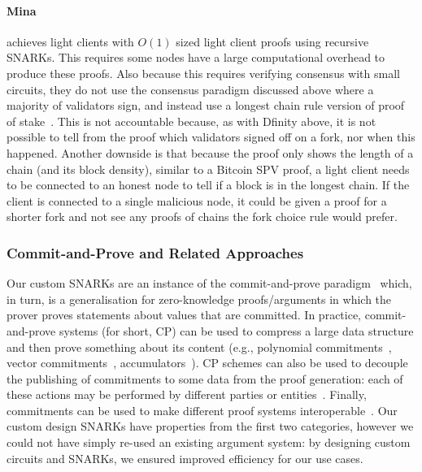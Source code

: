 \paragraph{Mina} achieves light clients with $O(1)$ sized light client proofs using recursive SNARKs. This requires some nodes have a large 
computational overhead to produce these proofs. Also because this requires verifying consensus with small circuits, they do not use the consensus 
paradigm discussed above where a majority of validators sign, and instead use a longest chain rule version of proof of stake~\cite{mina}. This is not 
accountable because, as with Dfinity above, it is not possible to tell from the proof which validators signed off on a fork, nor when this happened. Another 
downside is that because the proof only shows the length of a chain (and its block density), similar to a Bitcoin SPV proof, a light client needs to be connected to an 
honest node to tell if a block is in the longest chain. If the client is connected to a single malicious node, it could be given a proof for a shorter fork and not see any proofs of chains the fork choice rule would prefer.

\subsubsection{Commit-and-Prove and Related Approaches}
\label{sec:commit_prove}

Our custom SNARKs are an instance of the commit-and-prove paradigm~\cite{KilianPhD, CLOS02, CP_proposal} 
which, in turn, is a generalisation for zero-knowledge proofs/arguments in which the prover proves statements about values that are committed. 
In practice, commit-and-prove systems (for short, CP) can be used to compress a large data structure and then prove something about its content 
(e.g., polynomial commitments~\cite{KZG_10}, vector commitments~\cite{vector_commitment_1}, accumulators~\cite{first_accumulator}). CP schemes 
can also be used to decouple the publishing of commitments to some data from the proof generation: each of these actions may be performed by different 
parties or entities~\cite{zkp_reference}. Finally, commitments can be used to make different proof systems interoperable~\cite{CP_paper,interoperability_2}. 
Our custom design SNARKs have properties from the first two categories, however we could not have simply re-used an existing argument system: by 
designing custom circuits and SNARKs, we ensured improved efficiency for our use cases.  

